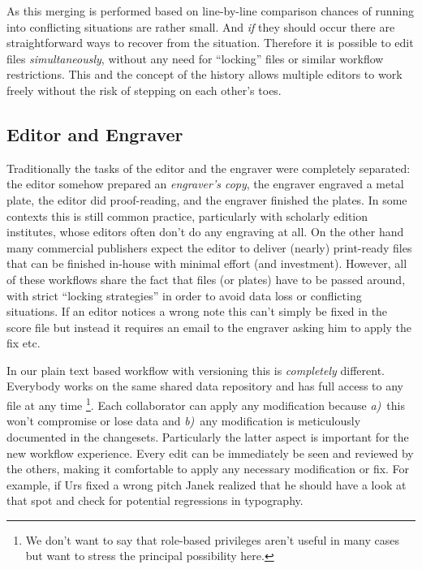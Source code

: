 \documentclass[11pt,a4paper]{article}
\begin{document}
As this merging is performed based on line-by-line comparison chances of running into
conflicting situations are rather small. And \emph{if} they should occur there are
straightforward ways to recover from the situation. Therefore it is possible to edit files
\emph{simultaneously}, without any need for “locking” files or similar workflow
restrictions. This and the concept of the history allows multiple editors to work freely without the risk of stepping on each other's toes. 

\subsection{Editor and Engraver}
Traditionally the tasks of the editor and the engraver were completely separated: the
editor somehow prepared an \emph{engraver's copy}, the engraver engraved a metal plate,
the editor did proof-reading, and the engraver finished the plates. In some contexts
this is still common practice, particularly with scholarly edition institutes, whose
editors often don't do any engraving at all. On the other hand many commercial
publishers expect the editor to deliver (nearly) print-ready files that can be
finished in-house with minimal effort (and investment). However, all of these workflows
share the fact that files (or plates) have to be passed around, with strict
“locking strategies” in order to avoid data loss or conflicting situations. If an editor
notices a wrong note this can't simply be fixed in the score file but instead it requires
an email to the engraver asking him to apply the fix etc.

In our plain text based workflow with versioning this is \emph{completely} different.
Everybody works on the same shared data repository and has full access to any file at any
time%
\footnote{We don't want to say that role-based privileges aren't useful in many cases
but want to stress the principal possibility here.}.
Each collaborator can apply any modification because 
\mbox{\emph{a)} this} won't compromise or lose data and
\mbox{\emph{b)} any} modification is meticulously documented in the changesets.
Particularly the latter aspect is important for the new workflow experience. 
Every edit can be immediately be seen and reviewed by the others, making it comfortable
to apply any necessary modification or fix. For example, if Urs fixed a wrong pitch Janek
realized that he should have a look at that spot and check for potential regressions
in typography.
\end{document}
